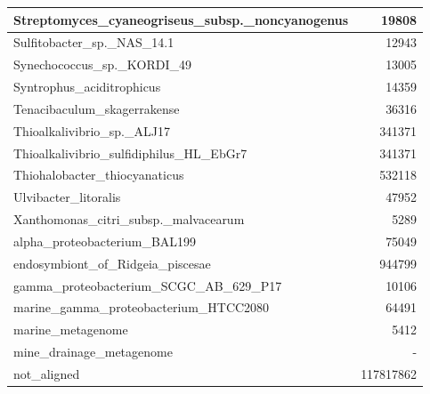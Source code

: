\documentclass[12pt,a4paper]{article}
\begin{document}
\begin{table}[ht]
\begin{center}
\begin{tabular}{|l*{1}{|r}|}
Streptomyces\_cyaneogriseus\_subsp.\_noncyanogenus & 19808 \\ \hline
Sulfitobacter\_sp.\_NAS\_14.1 & 12943 \\ \hline
Synechococcus\_sp.\_KORDI\_49 & 13005 \\ \hline
Syntrophus\_aciditrophicus & 14359 \\ \hline
Tenacibaculum\_skagerrakense & 36316 \\ \hline
Thioalkalivibrio\_sp.\_ALJ17 & 341371 \\ \hline
Thioalkalivibrio\_sulfidiphilus\_HL\_EbGr7 & 341371 \\ \hline
Thiohalobacter\_thiocyanaticus & 532118 \\ \hline
Ulvibacter\_litoralis & 47952 \\ \hline
Xanthomonas\_citri\_subsp.\_malvacearum & 5289 \\ \hline
alpha\_proteobacterium\_BAL199 & 75049 \\ \hline
endosymbiont\_of\_Ridgeia\_piscesae & 944799 \\ \hline
gamma\_proteobacterium\_SCGC\_AB\_629\_P17 & 10106 \\ \hline
marine\_gamma\_proteobacterium\_HTCC2080 & 64491 \\ \hline
marine\_metagenome & 5412 \\ \hline
mine\_drainage\_metagenome & - \\ \hline
not\_aligned & 117817862 \\ \hline
\end{tabular}
\end{center}
\end{table}
\end{document}
